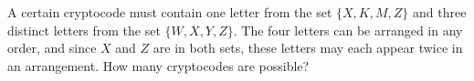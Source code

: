 A certain cryptocode must contain one letter from the set $\{X,K,M,Z\}$ and three distinct letters from the set $\{W,X,Y,Z\}$. The four letters can be arranged in any order, and since $X$ and $Z$ are in both sets, these letters may each appear twice in an arrangement. How many cryptocodes are possible?

